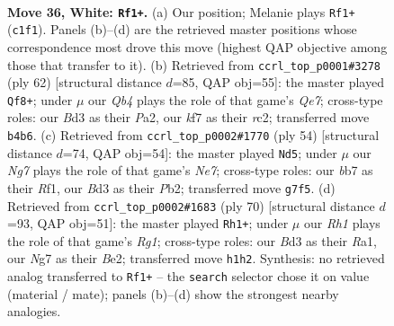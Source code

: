 \documentclass[11pt]{article}
\begin{document}
\clearpage

\begin{figure}[p]\centering
\begin{subfigure}{0.46\textwidth}\centering
\resizebox{\linewidth}{!}{%
\newchessgame
\chessboard[
  setfen={6nr/1b1q1kN1/8/r3P3/1Q5p/3B3P/1p4P1/2R3KR w - - 4 36},
  showmover=false,
  pgfstyle=straightmove, color=movearrow, markmove={c1-f1}
]}
\caption{}
\end{subfigure}\hfill
\begin{subfigure}{0.46\textwidth}\centering
\resizebox{\linewidth}{!}{%
\newchessgame
\chessboard[
  setfen={rn1R4/4Qp1p/4b2k/6q1/4p3/2N3P1/P1r1PP2/4R1K1 w - - 8 32},
  showmover=false,
  pgfstyle=straightmove, color=movearrow, markmove={e7-f8}
]}
\caption{}
\end{subfigure}
\\[4pt]
\begin{subfigure}{0.46\textwidth}\centering
\resizebox{\linewidth}{!}{%
\newchessgame
\chessboard[
  setfen={1q2kr2/4NpQp/8/4p1P1/r5bP/8/1PP5/2KR1R2 w - - 0 28},
  showmover=false,
  pgfstyle=straightmove, color=movearrow, markmove={e7-d5}
]}
\caption{}
\end{subfigure}\hfill
\begin{subfigure}{0.46\textwidth}\centering
\resizebox{\linewidth}{!}{%
\newchessgame
\chessboard[
  setfen={r1b4k/3Nb3/p1Q5/8/Pp2P3/4q3/1P2Br2/R3K1R1 w - - 8 36},
  showmover=false,
  pgfstyle=straightmove, color=movearrow, markmove={g1-h1}
]}
\caption{}
\end{subfigure}
\caption{\textbf{Move 36, White: \texttt{Rf1+}.} (a) Our position; Melanie plays \texttt{Rf1+} (\texttt{c1f1}). Panels (b)--(d) are the retrieved master positions whose correspondence most drove this move (highest QAP objective among those that transfer to it). (b) Retrieved from \texttt{ccrl\_top\_p0001\#3278} (ply 62) [structural distance $d$=85, QAP obj=55]: the master played \texttt{Qf8+}; under $\mu$ our \emph{Qb4} plays the role of that game's \emph{Qe7}; cross-type roles: our \emph{B}d3 as their \emph{P}a2, our \emph{k}f7 as their \emph{r}c2; transferred move \texttt{b4b6}. (c) Retrieved from \texttt{ccrl\_top\_p0002\#1770} (ply 54) [structural distance $d$=74, QAP obj=54]: the master played \texttt{Nd5}; under $\mu$ our \emph{Ng7} plays the role of that game's \emph{Ne7}; cross-type roles: our \emph{b}b7 as their \emph{R}f1, our \emph{B}d3 as their \emph{P}b2; transferred move \texttt{g7f5}. (d) Retrieved from \texttt{ccrl\_top\_p0002\#1683} (ply 70) [structural distance $d$=93, QAP obj=51]: the master played \texttt{Rh1+}; under $\mu$ our \emph{Rh1} plays the role of that game's \emph{Rg1}; cross-type roles: our \emph{B}d3 as their \emph{R}a1, our \emph{N}g7 as their \emph{B}e2; transferred move \texttt{h1h2}. Synthesis: no retrieved analog transferred to \texttt{Rf1+} -- the \texttt{search} selector chose it on value (material / mate); panels (b)--(d) show the strongest nearby analogies.}
\label{fig:thought-m70}
\end{figure}
\end{document}
